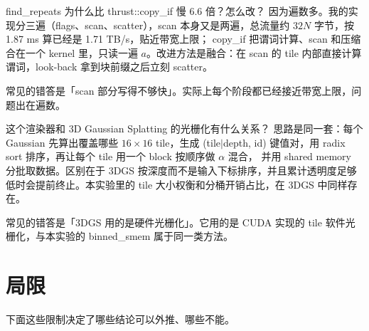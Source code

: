 \documentclass[11pt,a4paper]{ctexart}
\begin{document}
\begin{iqbox}{find\_repeats 为什么比 thrust::copy\_if 慢 6.6 倍？怎么改？}
因为遍数多。我的实现分三遍（flags、scan、scatter），scan 本身又是两遍，总流量约 $32N$ 字节，按 1.87 ms 算已经是 1.71 TB/s，贴近带宽上限；
copy\_if 把谓词计算、scan 和压缩合在一个 kernel 里，只读一遍 $a$。改进方法是融合：在 scan 的 tile 内部直接计算谓词，look-back 拿到块前缀之后立刻 scatter。
\par 常见的错答是「scan 部分写得不够快」。实际上每个阶段都已经接近带宽上限，问题出在遍数。
\end{iqbox}

\begin{iqbox}{这个渲染器和 3D Gaussian Splatting 的光栅化有什么关系？}
思路是同一套\cite{kerbl2023}：每个 Gaussian 先算出覆盖哪些 $16\times16$ tile，生成 (tile$|$depth, id) 键值对，用 radix sort 排序，再让每个 tile 用一个 block 按顺序做 $\alpha$ 混合，
并用 shared memory 分批取数据。区别在于 3DGS 按深度而不是输入下标排序，并且累计透明度足够低时会提前终止。本实验里的 tile 大小权衡和分桶开销占比，在 3DGS 中同样存在。
\par 常见的错答是「3DGS 用的是硬件光栅化」。它用的是 CUDA 实现的 tile 软件光栅化，与本实验的 binned\_smem 属于同一类方法。
\end{iqbox}

\section{局限}

下面这些限制决定了哪些结论可以外推、哪些不能。
\end{document}
